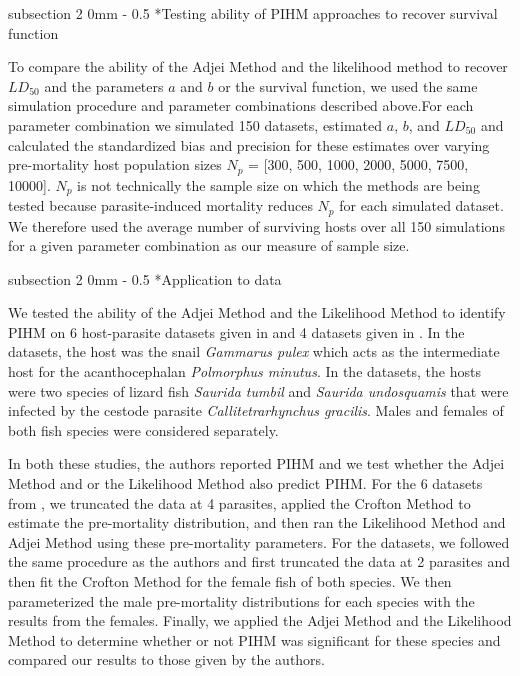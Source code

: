 \documentclass[12pt, a4paper]{article}
\makeatletter
\renewcommand{\subsection}{\@startsection
{subsection}%
{2}%
{0mm}%
{-\baselineskip}%
{0.5\baselineskip}%
{\normalfont\bf}} %
\makeatother
\begin{document}
\subsection*{Testing ability of PIHM approaches to recover survival function}

To compare the ability of the Adjei Method and the likelihood method to recover $LD_{50}$ and the parameters $a$ and $b$ or the survival function, we used the same simulation procedure and parameter combinations described above.For each parameter
combination we simulated 150 datasets, estimated $a$, $b$, and $LD_{50}$ and calculated the standardized bias and
precision \citep{Walther2005} for these estimates over varying pre-mortality host population sizes  $N_p$ = [300, 500, 1000, 2000, 5000, 7500,
10000]. $N_p$ is not technically the sample size on which the methods are being
tested because parasite-induced mortality reduces $N_p$ for each simulated
dataset.  We therefore used the average number of surviving hosts over all 150 simulations for a given parameter combination as our measure of sample size.

\subsection*{Application to data}

We tested the ability of the Adjei Method and the Likelihood Method to identify
PIHM on 6 host-parasite datasets given in \cite{Crofton1971a} and 4 datasets
given in \cite{Adjei1986}. In the \cite{Crofton1971a} datasets, the host was
the snail \emph{Gammarus pulex} which acts as the intermediate host for the
acanthocephalan \emph{Polmorphus minutus}. In the \cite{Adjei1986} datasets,
the hosts were two species of lizard fish \emph{Saurida tumbil} and
\emph{Saurida undosquamis} that were infected by the cestode parasite
\emph{Callitetrarhynchus gracilis}.  Males and females of both fish species
were considered separately.

In both these studies, the authors reported PIHM and we test whether the Adjei
Method and or the Likelihood Method also predict PIHM. For the 6 datasets from
\cite{Crofton1971a}, we truncated the data at 4 parasites, applied the Crofton
Method to estimate the pre-mortality distribution, and then ran the Likelihood
Method and Adjei Method using these pre-mortality parameters.  For the
\cite{Adjei1986} datasets, we followed the same procedure as the authors and
first truncated the data at 2 parasites and then fit the Crofton Method for the
female fish of both species.  We then parameterized the male pre-mortality
distributions for each species with the results from the females.  Finally, we
applied the Adjei Method and the Likelihood Method to determine whether or not
PIHM was significant for these species and compared our results to those given by the authors.
\end{document}
